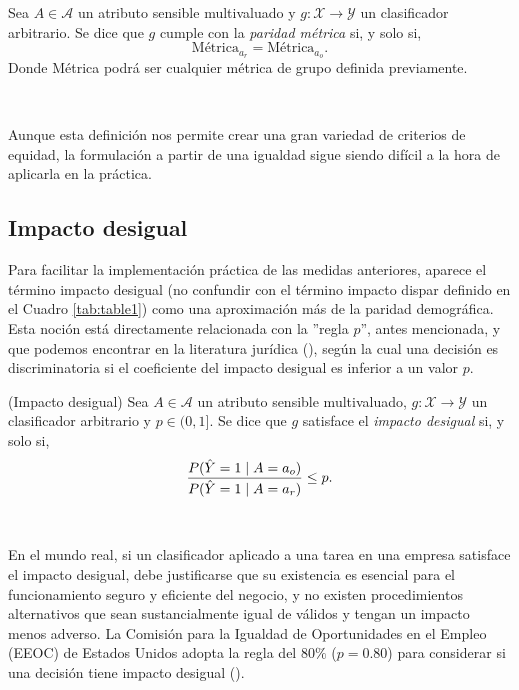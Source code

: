\documentclass[oneside,openright,titlepage,numbers=noenddot,openany,headinclude,footinclude=true,
cleardoublepage=empty,abstractoff,BCOR=5mm,paper=a4,fontsize=12pt,main=spanish]{scrreprt}
\begin{document}
\begin{definition}\label{def:parmetr}
Sea $A \in \mathcal{A}$ un atributo sensible multivaluado y $g\colon \mathcal{X} \to \mathcal{Y}$ un clasificador arbitrario. Se dice que $g$ cumple con la \textit{paridad métrica} si, y solo si, $$\text{Métrica}_{a_r}=\text{Métrica}_{a_o}.$$
Donde Métrica podrá ser cualquier métrica de grupo definida previamente. 
\end{definition}\

Aunque esta definición nos permite crear una gran variedad de criterios de equidad, la formulación a partir de una igualdad sigue siendo difícil a la hora de aplicarla en la práctica. 

\subsection{Impacto desigual}

Para facilitar la implementación práctica de las medidas anteriores, aparece el término impacto desigual (no confundir con el término impacto dispar definido en el Cuadro \ref{tab:table1}) como una aproximación más de la paridad demográfica. Esta noción está directamente relacionada con la ''regla $p$'', antes mencionada, y que podemos encontrar en la literatura jurídica (\cite{prule2018}), según la cual una decisión es discriminatoria si el coeficiente del impacto desigual es inferior a un valor $p$.\\

\begin{definition}(Impacto desigual) \label{def:mdi}
Sea $A \in \mathcal{A}$ un atributo sensible multivaluado, $g\colon \mathcal{X} \to \mathcal{Y}$ un clasificador arbitrario y $p\in (0,1]$. Se dice que $g$ satisface el \textit{impacto desigual} si, y solo si,
\begin{equation} \label{eq:1p}
    \frac{\displaystyle P(\hat{Y}=1 \mid A=a_o)}{\displaystyle P(\hat{Y}=1 \mid A=a_r)}\leq p.
\end{equation}
\end{definition}\

En el mundo real, si un clasificador aplicado a una tarea en una empresa satisface el impacto desigual, debe justificarse que su existencia es esencial para el funcionamiento seguro y eficiente del negocio, y no existen procedimientos alternativos que sean sustancialmente igual de válidos y tengan un impacto menos adverso. La Comisión para la Igualdad de Oportunidades en el Empleo (EEOC) de Estados Unidos adopta la regla del $80\%$ ($p = 0.80$) para considerar si una decisión tiene impacto desigual (\cite{adverse2009}).
\end{document}
